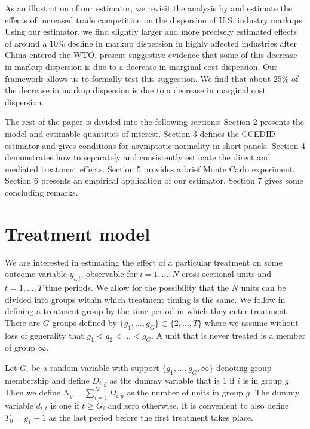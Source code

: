 \documentclass[12pt,fleqn]{article}
\begin{document}
As an illustration of our estimator, we revisit the analysis by \citet{lu2015trade} and estimate the effects of increased trade competition on the dispersion of U.S. industry markups. Using our estimator, we find slightly larger and more precisely estimated effects of around a 10\% decline in markup dispersion in highly affected industries after China entered the WTO. \citet{lu2015trade} present suggestive evidence that some of this decrease in markup dispersion is due to a decrease in marginal cost dispersion. Our framework allows us to formally test this suggestion. We find that about 25\% of the decrease in markup dispersion is due to a decrease in marginal cost dispersion. 

The rest of the paper is divided into the following sections: Section 2 presents the model and estimable quantities of interest. Section 3 defines the CCEDID estimator and gives conditions for asymptotic normality in short panels. Section 4 demonstrates how to separately and consistently estimate the direct and mediated treatment effects. Section 5 provides a brief Monte Carlo experiment. Section 6 presents an empirical application of our estimator. Section 7 gives some concluding remarks.

\section{Treatment model}\label{sec:treatment_model}

We are interested in estimating the effect of a particular treatment on some outcome variable $y_{i,t}$, observable for $i=1,...,N$ cross-sectional units and $t=1,...,T$ time periods. We allow for the possibility that the $N$ units can be divided into groups within which treatment timing is the same. We follow \citet{Callaway_SantAnna_2020} in defining a treatment group by the time period in which they enter treatment. There are $G$ groups defined by $\{g_1,...,g_G\} \subset \{2,...,T\}$ where we assume without loss of generality that $g_1 < g_2 < ... < g_G$. A unit that is never treated is a member of group $\infty$.

Let $G_i$ be a random variable with support $\{g_1,...,g_G,\infty\}$ denoting group membership and define $D_{i,g}$ as the dummy variable that is $1$ if $i$ is in group $g$. Then we define $N_g = \sum_{i = 1}^N D_{i,g}$ as the number of units in group $g$. The dummy variable $d_{i,t}$ is one if $t \geq G_i$ and zero otherwise. It is convenient to also define $T_0 = g_1 - 1$ as the last period before the first treatment takes place.
\end{document}
